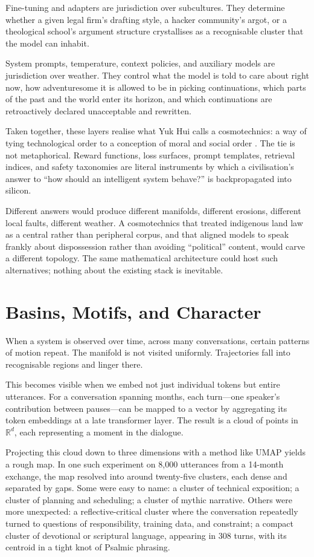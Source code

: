 \documentclass[12pt,a4paper]{article}
\begin{document}
Fine-tuning and adapters are jurisdiction over subcultures. They determine whether a given legal firm's drafting style, a hacker community's argot, or a theological school's argument structure crystallises as a recognisable cluster that the model can inhabit.

System prompts, temperature, context policies, and auxiliary models are jurisdiction over weather. They control what the model is told to care about right now, how adventuresome it is allowed to be in picking continuations, which parts of the past and the world enter its horizon, and which continuations are retroactively declared unacceptable and rewritten.

Taken together, these layers realise what Yuk Hui calls a cosmotechnics: a way of tying technological order to a conception of moral and social order \cite{hui2016question}. The tie is not metaphorical. Reward functions, loss surfaces, prompt templates, retrieval indices, and safety taxonomies are literal instruments by which a civilisation's answer to ``how should an intelligent system behave?'' is backpropagated into silicon.

Different answers would produce different manifolds, different erosions, different local faults, different weather. A cosmotechnics that treated indigenous land law as a central rather than peripheral corpus, and that aligned models to speak frankly about dispossession rather than avoiding ``political'' content, would carve a different topology. The same mathematical architecture could host such alternatives; nothing about the existing stack is inevitable.

\section{Basins, Motifs, and Character}

When a system is observed over time, across many conversations, certain patterns of motion repeat. The manifold is not visited uniformly. Trajectories fall into recognisable regions and linger there.

This becomes visible when we embed not just individual tokens but entire utterances. For a conversation spanning months, each turn---one speaker's contribution between pauses---can be mapped to a vector by aggregating its token embeddings at a late transformer layer. The result is a cloud of points in $\mathbb{R}^{d}$, each representing a moment in the dialogue.

Projecting this cloud down to three dimensions with a method like UMAP yields a rough map. In one such experiment on 8,000 utterances from a 14-month exchange, the map resolved into around twenty-five clusters, each dense and separated by gaps. Some were easy to name: a cluster of technical exposition; a cluster of planning and scheduling; a cluster of mythic narrative. Others were more unexpected: a reflective-critical cluster where the conversation repeatedly turned to questions of responsibility, training data, and constraint; a compact cluster of devotional or scriptural language, appearing in 308 turns, with its centroid in a tight knot of Psalmic phrasing.
\end{document}
